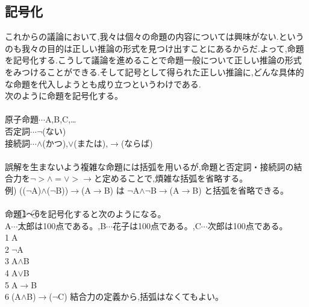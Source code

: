 \documentclass[10pt,b5paper,papersize,dvipdfmx]{jsbook}
\begin{document}
\subsection{記号化}
これからの議論において,我々は個々の命題の内容については興味がない.というのも我々の目的は正しい推論の形式を見つけ出すことにあるからだ.よって,命題を記号化する.こうして議論を進めることで命題一般について正しい推論の形式をみつけることができる.そして記号として得られた正しい推論に,どんな具体的な命題を代入しようとも成り立つというわけである.\\
次のように命題を記号化する。\\
\\
原子命題$\cdots$A,B,C,\dots\\
否定詞$\cdots$$\lnot$(ない)\\
接続詞$\cdots$$\land$(かつ),$\lor$(または),$\to$(ならば)\\
\\
誤解を生まないよう複雑な命題には括弧を用いるが,命題と否定詞・接続詞の結合力を$\lnot>\land=\lor>\to$と定めることで,煩雑な括弧を省略する。\\
例) (($\lnot$A)$\land$($\lnot$B))$\to$(A$\to$B) は $\lnot$A$\land$$\lnot$B$\to$(A$\to$B) と括弧を省略できる。\\
\\
命題\textcircled{\scriptsize 1}～\textcircled{\scriptsize 6}を記号化すると次のようになる。\\
A$\cdots$太郎は100点である。,B$\cdots$花子は100点である。,C$\cdots$次郎は100点である。\\
\textcircled{\scriptsize 1}A\\
\textcircled{\scriptsize 2}$\lnot$A\\
\textcircled{\scriptsize 3}A$\land$B\\
\textcircled{\scriptsize 4}A$\lor$B\\
\textcircled{\scriptsize 5}A$\to$B\\
\textcircled{\scriptsize 6}(A$\land$B)$\to$($\lnot$C) 結合力の定義から,括弧はなくてもよい。\\
\end{document}

